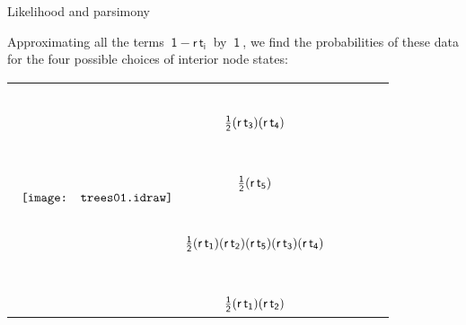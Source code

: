 \documentclass[bluish,slideColor,colorBG,pdf]{prosper}
\begin{document}
\begin{slide}[Replace]{Likelihood and parsimony}

Approximating all the terms $\mathsf{~1 - r\,t_i~}$ by $\mathsf{~1~}$, we
find the probabilities of these data for the four possible choices of interior node states:

\begin{tabular}{c c}
$\begin{array}{c c}
\multirow{15}{*}{\texttt{[image: trees01.idraw]}} & \\
& \\
& \mathsf{\frac{1}{2} (r\,t_3) (r\,t_4)} \\
& \\
& \\
& \\
 & \mathsf{\frac{1}{2} (r\,t_5) } \\
& \\
& \\
& \\
 & \mathsf{\frac{1}{2} (r\,t_1) (r\,t_2) (r\,t_5) (r\,t_3) (r\,t_4)} \\
& \\
& \\
& \\
 & \mathsf{\frac{1}{2} (r\,t_1) (r\,t_2)}
\end{array}
$
& {~~~~~}
\end{tabular}

\end{slide}
\end{document}
